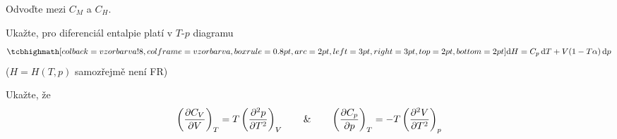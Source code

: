 \begin{priklad}[Příklad 4]
Odvoďte  mezi $C_M$ a $C_H$.
\end{priklad}

\begin{priklad}[Příklad 5*]
Ukažte, pro diferenciál entalpie platí v $T$-$p$ diagramu
\[ \vzorec{\dd H = C_p\,\dd T + V(1 - T\alpha)\,\dd p} \]
($H = H(T,p)$ samozřejmě není FR)
\end{priklad}

\begin{priklad}[Příklad 6*]
Ukažte, že
\[
  \left(\pdv{C_V}{V}\right)_T = T\left(\pdv[2]{p}{T}\right)_V
  \qquad \& \qquad
  \left(\pdv{C_p}{p}\right)_T = -T\left(\pdv[2]{V}{T}\right)_p
\]
\end{priklad}

